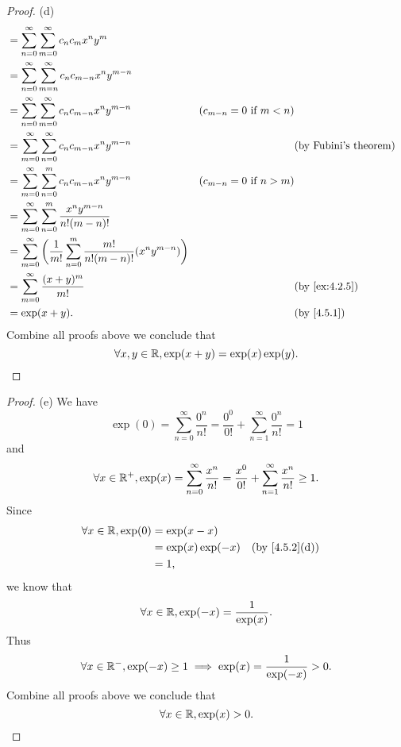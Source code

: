 \begin{proof}{(d)}
\begin{align*}
     & = \sum_{n = 0}^\infty \sum_{m = 0}^\infty c_n c_m x^n y^m                                                                                                                 \\
     & = \sum_{n = 0}^\infty \sum_{m = n}^\infty c_n c_{m - n} x^n y^{m - n}                                                                                                     \\
     & = \sum_{n = 0}^\infty \sum_{m = 0}^\infty c_n c_{m - n} x^n y^{m - n}                                  & (c_{m - n} = 0 \text{ if } m < n)                                \\
     & = \sum_{m = 0}^\infty \sum_{n = 0}^\infty c_n c_{m - n} x^n y^{m - n}                                  &                                   & \text{(by Fubini's theorem)} \\
     & = \sum_{m = 0}^\infty \sum_{n = 0}^m c_n c_{m - n} x^n y^{m - n}                                       & (c_{m - n} = 0 \text{ if } n > m)                                \\
     & = \sum_{m = 0}^\infty \sum_{n = 0}^m \dfrac{x^n y^{m - n}}{n! (m - n)!}                                                                                                   \\
     & = \sum_{m = 0}^\infty \bigg(\dfrac{1}{m!} \sum_{n = 0}^m \dfrac{m!}{n! (m - n)!} (x^n y^{m - n})\bigg)                                                                    \\
     & = \sum_{m = 0}^\infty \dfrac{(x + y)^m}{m!}                                                            &                                   & \by{ex:4.2.5}                \\
     & = \exp(x + y).                                                                                         &                                   & \by{4.5.1}
  \end{align*}
  Combine all proofs above we conclude that
  \[
    \forall x, y \in \mathbb{R}, \exp(x + y) = \exp(x) \exp(y).
  \]
\end{proof}

\begin{proof}{(e)}
  We have
  \[
    \exp(0) = \sum_{n = 0}^\infty \dfrac{0^n}{n!} = \dfrac{0^0}{0!} + \sum_{n = 1}^\infty \dfrac{0^n}{n!} = 1
  \]
  and
  \[
    \forall x \in \mathbb{R}^+, \exp(x) = \sum_{n = 0}^\infty \dfrac{x^n}{n!} = \dfrac{x^0}{0!} + \sum_{n = 1}^\infty \dfrac{x^n}{n!} \geq 1.
  \]
  Since
  \begin{align*}
    \forall x \in \R, \exp(0) & = \exp(x - x)                                       \\
                              & = \exp(x) \exp(-x) &  & \text{(by \cref{4.5.2}(d))} \\
                              & = 1,
  \end{align*}
  we know that
  \[
    \forall x \in \mathbb{R}, \exp(-x) = \dfrac{1}{\exp(x)}.
  \]
  Thus
  \[
    \forall x \in \mathbb{R}^-, \exp(-x) \geq 1 \implies \exp(x) = \dfrac{1}{\exp(-x)} > 0.
  \]
  Combine all proofs above we conclude that
  \[
    \forall x \in \mathbb{R}, \exp(x) > 0.
  \]
\end{proof}

